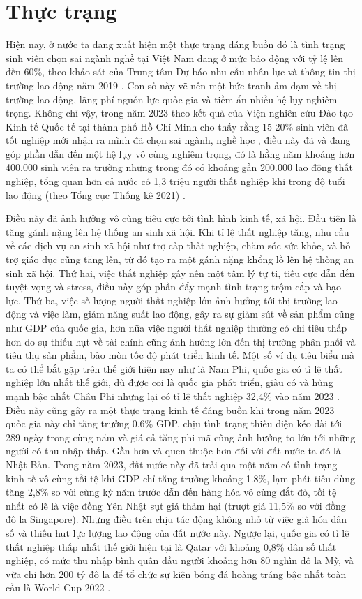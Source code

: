 \section{Thực trạng}
Hiện nay, ở nước ta đang xuất hiện một thực trạng đáng buồn đó là tình trạng sinh viên chọn sai ngành nghề tại Việt Nam đang ở mức báo động với tỷ lệ lên đến 60\%, theo khảo sát của Trung tâm Dự báo nhu cầu nhân lực và thông tin thị trường lao động năm 2019 \cite{tienphong}. Con số này vẽ nên một bức tranh ảm đạm về thị trường lao động, lãng phí nguồn lực quốc gia và tiềm ẩn nhiều hệ lụy nghiêm trọng. Không chỉ vậy, trong năm 2023 theo kết quả của Viện nghiên cứu Đào tạo Kinh tế Quốc tế tại thành phố Hồ Chí Minh cho thấy rằng 15-20\% sinh viên đã tốt nghiệp mới nhận ra mình đã chọn sai ngành, nghề học \cite{thanhnien1}, điều này đã và đang góp phần dẫn đến một hệ lụy vô cùng nghiêm trọng, đó là hằng năm khoảng hơn 400.000 sinh viên ra trường nhưng trong đó có khoảng gần 200.000 lao động thất nghiệp, tổng quan hơn cả nước có 1,3 triệu người thất nghiệp khi trong độ tuổi lao động (theo Tổng cục Thống kê 2021) \cite{thanhnien2}. 

Điều này đã ảnh hưởng vô cùng tiêu cực tới tình hình kinh tế, xã hội. Đầu tiên là tăng gánh nặng lên hệ thống an sinh xã hội. Khi tỉ lệ thất nghiệp tăng, nhu cầu về các dịch vụ an sinh xã hội như trợ cấp thất nghiệp, chăm sóc sức khỏe, và hỗ trợ giáo dục cũng tăng lên, từ đó tạo ra một gánh nặng khổng lồ lên hệ thống an sinh xã hội. Thứ hai, việc thất nghiệp gây nên một tâm lý tự ti, tiêu cực dẫn đến tuyệt vọng và stress, điều này góp phần đẩy mạnh tình trạng trộm cắp và bạo lực. Thứ ba, việc số lượng người thất nghiệp lớn ảnh hưởng tới thị trường lao động và việc làm, giảm năng suất lao động, gây ra sự giảm sút về sản phẩm cũng như GDP của quốc gia, hơn nữa việc người thất nghiệp thường có chi tiêu thấp hơn do sự thiếu hụt về tài chính cũng ảnh hưởng lớn đến thị trường phân phối và tiêu thụ sản phẩm, bào mòn tốc độ phát triển kinh tế. Một số ví dụ tiêu biểu mà ta có thể bắt gặp trên thế giới hiện nay như là Nam Phi, quốc gia có tỉ lệ thất nghiệp lớn nhất thế giới, dù được coi là quốc gia phát triển, giàu có và hùng mạnh bậc nhất Châu Phi nhưng lại có tỉ lệ thất nghiệp 32,4\% vào năm 2023 \cite{Investopedia}. Điều này cũng gây ra một thực trạng kinh tế đáng buồn khi trong năm 2023 quốc gia này chỉ tăng trưởng 0.6\% GDP, chịu tình trạng thiếu điện kéo dài tới 289 ngày trong cùng năm và giá cả tăng phi mã cũng ảnh hưởng to lớn tới những người có thu nhập thấp. Gần hơn và quen thuộc hơn đối với đất nước ta đó là Nhật Bản. Trong năm 2023, đất nước này đã trải qua một năm có tình trạng kinh tế vô cùng tồi tệ khi GDP chỉ tăng trưởng khoảng 1.8\%, lạm phát tiêu dùng tăng 2,8\% so với cùng kỳ năm trước dẫn đến hàng hóa vô cùng đắt đỏ, tồi tệ nhất có lẽ là việc đồng Yên Nhật sụt giá thảm hại (trượt giá 11,5\% so với đồng đô la Singapore). Những điều trên chịu tác động không nhỏ từ việc già hóa dân số và thiếu hụt lực lượng lao động của đất nước này. Ngược lại, quốc gia có tỉ lệ thất nghiệp thấp nhất thế giới hiện tại là Qatar với khoảng 0,8\% dân số thất nghiệp, có mức thu nhập bình quân đầu người khoảng hơn 80 nghìn đô la Mỹ, và vừa chi hơn 200 tỷ đô la để tổ chức sự kiện bóng đá hoàng tráng bậc nhất toàn cầu là World Cup 2022 \cite{Investopedia}.

